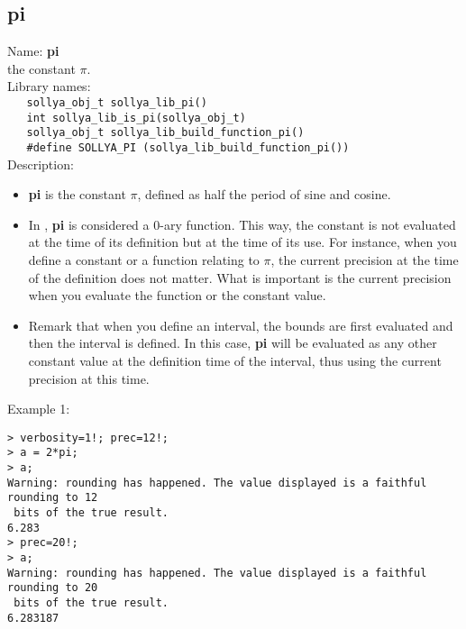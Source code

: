 \subsection{pi}
\label{labpi}
\noindent Name: \textbf{pi}\\
\phantom{aaa}the constant $\pi$.\\[0.2cm]
\noindent Library names:\\
\verb|   sollya_obj_t sollya_lib_pi()|\\
\verb|   int sollya_lib_is_pi(sollya_obj_t)|\\
\verb|   sollya_obj_t sollya_lib_build_function_pi()|\\
\verb|   #define SOLLYA_PI (sollya_lib_build_function_pi())|\\[0.2cm]
\noindent Description: \begin{itemize}

\item \textbf{pi} is the constant $\pi$, defined as half the period of sine and cosine.

\item In \sollya, \textbf{pi} is considered a 0-ary function. This way, the constant 
   is not evaluated at the time of its definition but at the time of its use. For 
   instance, when you define a constant or a function relating to $\pi$, the current
   precision at the time of the definition does not matter. What is important is 
   the current precision when you evaluate the function or the constant value.

\item Remark that when you define an interval, the bounds are first evaluated and 
   then the interval is defined. In this case, \textbf{pi} will be evaluated as any 
   other constant value at the definition time of the interval, thus using the 
   current precision at this time.
\end{itemize}
\noindent Example 1: 
\begin{center}\begin{minipage}{15cm}\begin{Verbatim}[frame=single]
> verbosity=1!; prec=12!;
> a = 2*pi;
> a;
Warning: rounding has happened. The value displayed is a faithful rounding to 12
 bits of the true result.
6.283
> prec=20!;
> a;
Warning: rounding has happened. The value displayed is a faithful rounding to 20
 bits of the true result.
6.283187
\end{Verbatim}
\end{minipage}\end{center}
